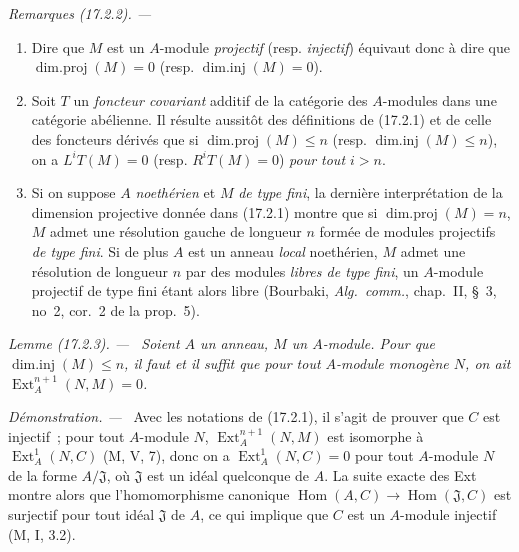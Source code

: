 \documentclass[10pt,oneside]{book}
\makeatletter
\newcommand{\setmanualcurrentlabel}[1]{\def\@currentlabel{#1}}
\newcommand{\oldpage}[2][]{%
  \setcounter{footnote}{0}%
  \marginpar{\scriptsize\textbf{#1}~|~#2}\ignorespaces}
\newenvironment{remarks}[1][]{%
  \setmanualcurrentlabel{#1}\par\medskip\noindent\itshape Remarques (#1). ---\ }{\par}
\newenvironment{lemma}[1][]{%
  \setmanualcurrentlabel{#1}\par\medskip\noindent\itshape Lemme (#1). ---\ }{\par}
\newenvironment{proof}{%
  \par\medskip\noindent\textit{Démonstration. ---\ }}{\par}
\makeatother
\begin{document}
\begin{remarks}[17.2.2]
\label{0.17.2.2-fr}
\begin{enumerate}
  \item[\rm (i)] Dire que $M$ est un $A$-module \emph{projectif} (resp.
  \emph{injectif}) équivaut donc à dire que
  $\operatorname{dim.proj}(M)=0$ (resp. $\operatorname{dim.inj}(M)=0$).
  \item[\rm (ii)] Soit $T$ un \emph{foncteur covariant} additif de la catégorie
  des $A$-modules dans une catégorie abélienne. Il résulte aussitôt des
  définitions de (17.2.1) et de celle des
  \oldpage[0\textsubscript{IV-1}]{43}
  foncteurs dérivés que si $\operatorname{dim.proj}(M)\leq n$ (resp.
  $\operatorname{dim.inj}(M)\leq n$), on a $L^iT(M)=0$ (resp.
  $R^iT(M)=0$) \emph{pour tout $i>n$}.
  \item[\rm (iii)] Si on suppose $A$ \emph{noethérien} et $M$ \emph{de type
  fini}, la dernière interprétation de la dimension projective donnée dans
  (17.2.1) montre que si $\operatorname{dim.proj}(M)=n$, $M$ admet une
  résolution gauche de longueur $n$ formée de modules projectifs \emph{de type
  fini}. Si de plus $A$ est un anneau \emph{local} noethérien, $M$ admet une
  résolution de longueur $n$ par des modules \emph{libres de type fini}, un
  $A$-module projectif de type fini étant alors libre (Bourbaki,
  \emph{Alg.~comm.}, chap.~II, \S~3, no~2, cor.~2 de la prop.~5).
\end{enumerate}
\end{remarks}

\begin{lemma}[17.2.3]
\label{0.17.2.3-fr}
Soient $A$ un anneau, $M$ un $A$-module. Pour que
$\operatorname{dim.inj}(M)\leq n$, il faut et il suffit que pour tout
$A$-module monogène $N$, on ait $\operatorname{Ext}^{n+1}_A(N,M)=0$.
\end{lemma}

\begin{proof}
Avec les notations de (17.2.1), il s'agit de prouver que $C$ est injectif~;
pour tout $A$-module $N$, $\operatorname{Ext}^{n+1}_A(N,M)$ est isomorphe à
$\operatorname{Ext}^1_A(N,C)$ (M, V, 7), donc on a
$\operatorname{Ext}^1_A(N,C)=0$ pour tout $A$-module $N$ de la forme
$A/\mathfrak{J}$, où $\mathfrak{J}$ est un idéal quelconque de $A$. La suite
exacte des Ext montre alors que l'homomorphisme canonique
$\operatorname{Hom}(A,C)\longrightarrow\operatorname{Hom}(\mathfrak{J},C)$ est
surjectif pour tout idéal $\mathfrak{J}$ de $A$, ce qui implique que $C$ est un
$A$-module injectif (M, I, 3.2).
\end{proof}
\end{document}
